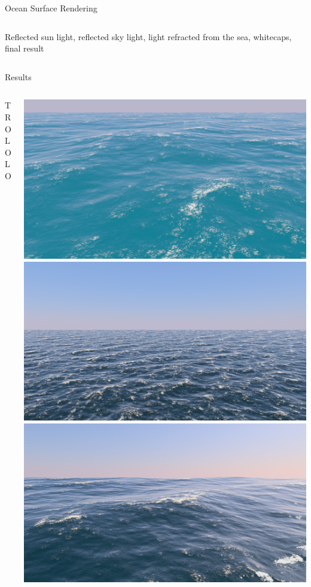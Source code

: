 \documentclass[final,hyperref={pdfpagelabels=true}]{beamer}
\begin{document}
\begin{frame}
\begin{center}
\begin{minipage}{\textwidth}
\begin{block}{Ocean Surface Rendering}
\begin{columns}[t]
\begin{column}{0.25\linewidth}
					Reflected sun light, reflected sky light, light refracted from the sea,
					whitecaps, final result
				\end{column}				
			\end{columns}
		\end{block}
	\end{minipage}
	\begin{minipage}{\textwidth}
		\begin{block}{Results}
			\begin{columns}[t]
				\begin{column}{0.25\linewidth}
				TROLOLO
				\end{column}
				\begin{column}{0.75\linewidth}
				\begin{center}
				\noindent
				\includegraphics[width=0.225\columnwidth]{figures/21-06-2018_13-45-06_complete}
				\includegraphics[width=0.225\columnwidth]{figures/21-06-2018_10-44-51_complete}
				\includegraphics[width=0.225\columnwidth]{figures/21-06-2018_12-48-51_complete}	
				\end{center}
				\end{column}
			\end{columns}
		\end{block}
	\end{minipage}
	\end{center}
    

\end{frame}
\end{document}
